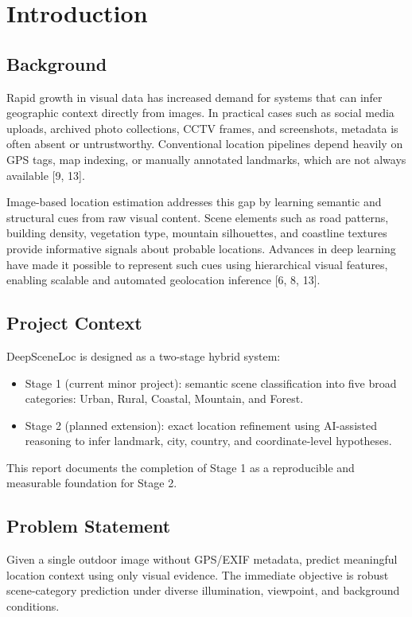 \chapter{Introduction}

\section{Background}
Rapid growth in visual data has increased demand for systems that can infer geographic context directly from images. In practical cases such as social media uploads, archived photo collections, CCTV frames, and screenshots, metadata is often absent or untrustworthy. Conventional location pipelines depend heavily on GPS tags, map indexing, or manually annotated landmarks, which are not always available [9, 13].

Image-based location estimation addresses this gap by learning semantic and structural cues from raw visual content. Scene elements such as road patterns, building density, vegetation type, mountain silhouettes, and coastline textures provide informative signals about probable locations. Advances in deep learning have made it possible to represent such cues using hierarchical visual features, enabling scalable and automated geolocation inference [6, 8, 13].

\section{Project Context}
DeepSceneLoc is designed as a two-stage hybrid system:
\begin{itemize}
\item Stage 1 (current minor project): semantic scene classification into five broad categories: Urban, Rural, Coastal, Mountain, and Forest.
\item Stage 2 (planned extension): exact location refinement using AI-assisted reasoning to infer landmark, city, country, and coordinate-level hypotheses.
\end{itemize}

This report documents the completion of Stage 1 as a reproducible and measurable foundation for Stage 2.

\section{Problem Statement}
Given a single outdoor image without GPS/EXIF metadata, predict meaningful location context using only visual evidence. The immediate objective is robust scene-category prediction under diverse illumination, viewpoint, and background conditions.

